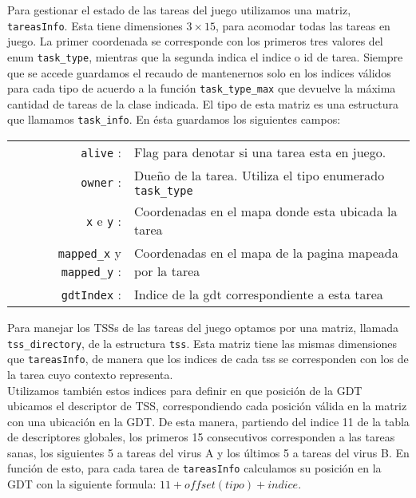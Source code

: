 \label{sec-tss-tareasInfo}
Para gestionar el estado de las tareas del juego utilizamos una matriz, \verb|tareasInfo|. Esta tiene dimensiones $3\times15$, para acomodar todas las tareas en juego. La primer coordenada se corresponde con los primeros tres valores del enum \verb|task_type|, mientras que la segunda indica el indice o id de tarea. 
Siempre que se accede guardamos el recaudo de mantenernos solo en los indices válidos para cada tipo de acuerdo a la función \verb|task_type_max| que devuelve la máxima cantidad de tareas de la clase indicada. 
El tipo de esta matriz es una estructura que llamamos \verb|task_info|.
En ésta guardamos los siguientes campos:\\


\begin{center}
	\begin{tabular}{r p{} }
		\verb|alive| : & Flag para denotar si una tarea esta en juego. \\
		\verb|owner| : & Dueño de la tarea. Utiliza el tipo enumerado \verb|task_type|\\
		\verb|x| e \verb|y| : & Coordenadas en el mapa donde esta ubicada la tarea\\
		\verb|mapped_x| y \verb|mapped_y| : & Coordenadas en el mapa de la pagina mapeada por la tarea\\
		\verb|gdtIndex| : & Indice de la gdt correspondiente a esta tarea\\
	\end{tabular}
\end{center}
\vspace{10pt}

Para manejar los TSSs de las tareas del juego optamos por una matriz, llamada \verb|tss_directory|, de la estructura \verb|tss|. Esta matriz tiene las mismas dimensiones que \verb|tareasInfo|, de manera que los indices de cada tss se corresponden con los de la tarea cuyo contexto representa. 
\\

Utilizamos también estos indices para definir en que posición de la GDT ubicamos el descriptor de TSS, correspondiendo cada posición válida en la matriz con una ubicación en la GDT. De esta manera, partiendo del indice 11 de la tabla de descriptores globales, los primeros 15 consecutivos corresponden a las tareas sanas, los siguientes 5 a tareas del virus A y los últimos 5 a tareas del virus B.
En función de esto, para cada tarea de \verb|tareasInfo| calculamos su posición en la GDT con la siguiente formula: $ 11 + offset(tipo) + indice$.\\


